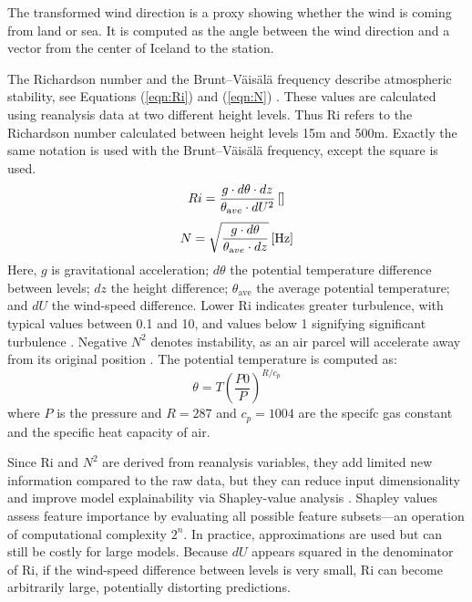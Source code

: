 The transformed wind direction is a proxy showing whether the wind is coming from land or sea. It is computed as the angle between the wind direction and a vector from the center of Iceland to the station.

The Richardson number and the Brunt–Väisälä frequency describe atmospheric stability, see Equations (\ref{eqn:Ri}) and (\ref{eqn:N}) \cite{richardson_number_skybrary,brunt_vaisala_freq_eumtrain,mean_gust_HA_HO}. These values are calculated using reanalysis data at two different height levels. Thus Ri refers to the Richardson number calculated between height levels 15m and 500m. Exactly the same notation is used with the Brunt–Väisälä frequency, except the square is used.
%
\begin{equation}
  \label{eqn:Ri}
  Ri = \frac{g \cdot d\theta \cdot dz}{\theta_{\textrm ave} \cdot dU^2} \, \mathrm{[]}
\end{equation}
%
\begin{equation}
  \label{eqn:N}
  N = \sqrt{\frac{g \cdot d\theta }{\theta_{\textrm ave} \cdot dz}} \, \mathrm{[Hz]}
\end{equation}
%
Here, $g$ is gravitational acceleration; $d\theta$ the potential temperature difference between levels; $dz$ the height difference; $\theta_{\mathrm{ave}}$ the average potential temperature; and $dU$ the wind-speed difference. Lower Ri indicates greater turbulence, with typical values between 0.1 and 10, and values below 1 signifying significant turbulence \cite{richardson_number_skybrary}. Negative $N^2$ denotes instability, as an air parcel will accelerate away from its original position \cite{brunt_vaisala_freq_eumtrain}. The potential temperature is computed as:
%
\begin{equation}
  \label{eqn:potential_temp}
  \theta = T\left(\dfrac{P0}{P}\right)^{R/c_p}
\end{equation}
%
where $P$ is the pressure and $R = 287$ and $c_p = 1004$ are the specifc gas constant and the specific heat capacity of air.

Since Ri and $N^2$ are derived from reanalysis variables, they add limited new information compared to the raw data, but they can reduce input dimensionality and improve model explainability via Shapley-value analysis \cite{shapley_information}. Shapley values assess feature importance by evaluating all possible feature subsets—an operation of computational complexity $2^n$. In practice, approximations are used but can still be costly for large models. Because $dU$ appears squared in the denominator of Ri, if the wind-speed difference between levels is very small, Ri can become arbitrarily large, potentially distorting predictions.

